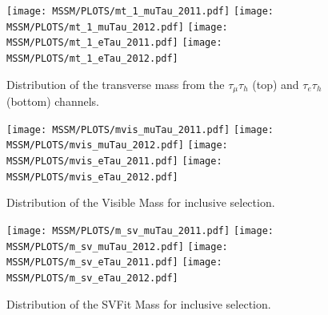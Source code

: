 \begin{figure}[htbp]
  \begin{center}
    \texttt{[image: MSSM/PLOTS/mt\_1\_muTau\_2011.pdf]}
    \texttt{[image: MSSM/PLOTS/mt\_1\_muTau\_2012.pdf]}
    \texttt{[image: MSSM/PLOTS/mt\_1\_eTau\_2011.pdf]}
    \texttt{[image: MSSM/PLOTS/mt\_1\_eTau\_2012.pdf]}
    \caption{
      Distribution of the transverse mass from the $\tau_{\mu}\tau_{h}$ (top) and  $\tau_{e}\tau_{h}$ (bottom) channels.}
    \label{figure:MT}
  \end{center}
\end{figure}

\begin{figure}[htbp]
  \begin{center}
    \texttt{[image: MSSM/PLOTS/mvis\_muTau\_2011.pdf]}
    \texttt{[image: MSSM/PLOTS/mvis\_muTau\_2012.pdf]}
    \texttt{[image: MSSM/PLOTS/mvis\_eTau\_2011.pdf]}
    \texttt{[image: MSSM/PLOTS/mvis\_eTau\_2012.pdf]}
    \caption{
      Distribution of the Visible Mass for inclusive selection.
    }
    \label{figure:mVis}
  \end{center}
\end{figure}


\begin{figure}[htbp]
  \begin{center}
    \texttt{[image: MSSM/PLOTS/m\_sv\_muTau\_2011.pdf]}
    \texttt{[image: MSSM/PLOTS/m\_sv\_muTau\_2012.pdf]}
    \texttt{[image: MSSM/PLOTS/m\_sv\_eTau\_2011.pdf]}
    \texttt{[image: MSSM/PLOTS/m\_sv\_eTau\_2012.pdf]}
    \caption{
      Distribution of the SVFit Mass for inclusive selection.
    }
    \label{figure:svFit}
  \end{center}
\end{figure}


